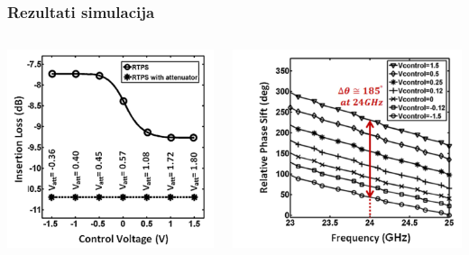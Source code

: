 \documentclass{beamer}
\begin{document}
\begin{frame}
\frametitle{Rezultati simulacija}
\begin{columns}
  \begin{column}{0.5\textwidth}
    \includegraphics[width=\textwidth]{insertion_loss_w_wo_att.png}
  \end{column}
  \begin{column}{0.5\textwidth}
    \includegraphics[width=\textwidth]{phase_shift_range.png}
  \end{column}
\end{columns}
\end{frame}
\end{document}
